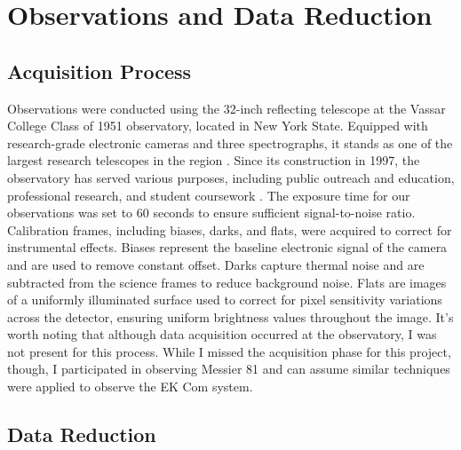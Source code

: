\documentclass[]{aastex63}
\begin{document}
\section{Observations and Data Reduction}

\subsection{Acquisition Process}
Observations were conducted using the 32-inch reflecting telescope at the Vassar College Class of 1951 observatory, located in New York State. Equipped with research-grade electronic cameras and three spectrographs, it stands as one of the largest research telescopes in the region \citep{Elmegreen}. Since its construction in 1997, the observatory has served various purposes, including public outreach and education, professional research, and student coursework \citep{Elmegreen}. The exposure time for our observations was set to 60 seconds to ensure sufficient signal-to-noise ratio. Calibration frames, including biases, darks, and flats, were acquired to correct for instrumental effects. Biases represent the baseline electronic signal of the camera and are used to remove constant offset. Darks capture thermal noise and are subtracted from the science frames to reduce background noise. Flats are images of a uniformly illuminated surface used to correct for pixel sensitivity variations across the detector, ensuring uniform brightness values throughout the image. It's worth noting that although data acquisition occurred at the observatory, I was not present for this process. While I missed the acquisition phase for this project, though, I participated in observing Messier 81 and can assume similar techniques were applied to observe the EK Com system.


\subsection{Data Reduction}
\end{document}
